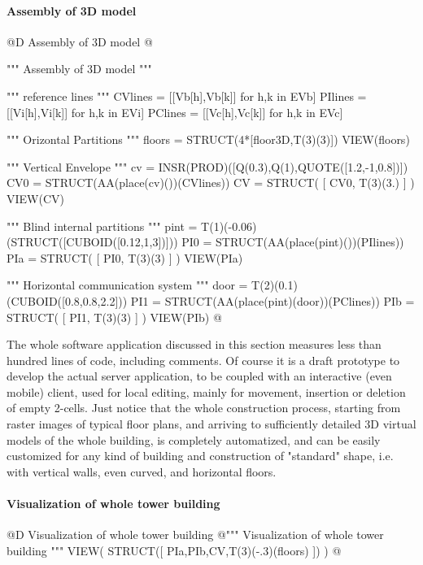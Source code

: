 \documentclass[11pt,oneside]{article}    %
\begin{document}
\paragraph{Assembly of 3D model}
@D Assembly of 3D model
@{""" Assembly of 3D model """

""" reference lines """
CVlines = [[Vb[h],Vb[k]] for h,k in EVb]
PIlines = [[Vi[h],Vi[k]] for h,k in EVi]
PClines = [[Vc[h],Vc[k]] for h,k in EVc]

""" Orizontal Partitions """
floors = STRUCT(4*[floor3D,T(3)(3)])
VIEW(floors)

""" Vertical Envelope """
cv = INSR(PROD)([Q(0.3),Q(1),QUOTE([1.2,-1,0.8])])
CV0 = STRUCT(AA(place(cv)())(CVlines))
CV = STRUCT( [ CV0, T(3)(3.) ] )
VIEW(CV)

""" Blind internal partitions """
pint = T(1)(-0.06)(STRUCT([CUBOID([0.12,1,3])]))
PI0 = STRUCT(AA(place(pint)())(PIlines))
PIa = STRUCT( [ PI0, T(3)(3) ] )
VIEW(PIa)

""" Horizontal communication system """
door = T(2)(0.1)(CUBOID([0.8,0.8,2.2]))
PI1 = STRUCT(AA(place(pint)(door))(PClines))
PIb = STRUCT( [ PI1, T(3)(3) ] )
VIEW(PIb)
@}

The whole software application discussed in this section measures less than hundred lines of code, including comments. Of course it is a draft prototype to develop the actual server application, to be coupled with an interactive (even mobile) client, used for local editing, mainly for movement, insertion or deletion of empty 2-cells. Just notice that the whole construction process, starting from raster images of typical floor plans, and arriving to sufficiently detailed 3D virtual models of the whole building, is completely automatized, and can be easily customized for any kind of building and construction of "standard" shape, i.e. with vertical walls, even curved, and horizontal floors.

\paragraph{Visualization of whole tower building}
@D Visualization of whole tower building
@{""" Visualization of whole tower building """
VIEW( STRUCT([ PIa,PIb,CV,T(3)(-.3)(floors) ]) )
@}
\end{document}
